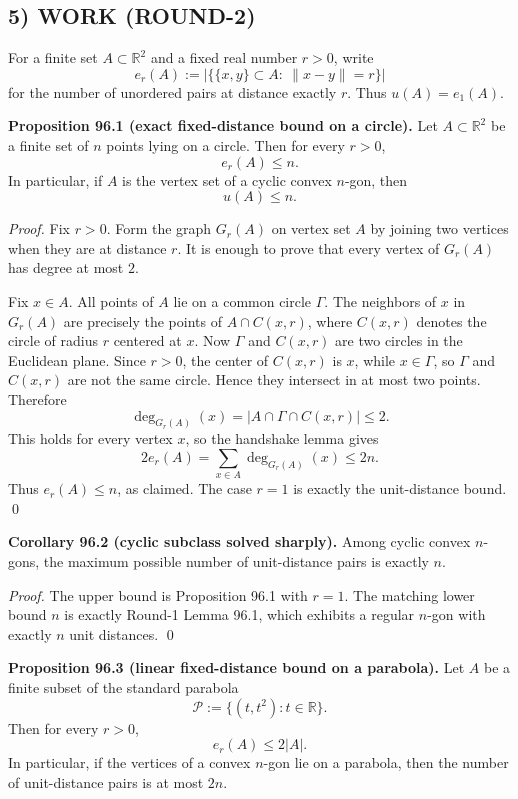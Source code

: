 \subsection*{5) WORK (ROUND-2)}

For a finite set $A\subset \mathbb R^2$ and a fixed real number $r>0$, write
\[
  e_r(A):=\bigl|\{\{x,y\}\subset A:\ \|x-y\|=r\}\bigr|
\]
for the number of unordered pairs at distance exactly $r$.
Thus $u(A)=e_1(A)$.

\medskip
\noindent\textbf{Proposition 96.1 (exact fixed-distance bound on a circle).}
Let $A\subset \mathbb R^2$ be a finite set of $n$ points lying on a circle. Then for every $r>0$,
\[
  e_r(A)\le n.
\]
In particular, if $A$ is the vertex set of a cyclic convex $n$-gon, then
\[
  u(A)\le n.
\]

\emph{Proof.}
Fix $r>0$. Form the graph $G_r(A)$ on vertex set $A$ by joining two vertices when they are at distance $r$.
It is enough to prove that every vertex of $G_r(A)$ has degree at most $2$.

Fix $x\in A$. All points of $A$ lie on a common circle $\Gamma$. The neighbors of $x$ in $G_r(A)$ are precisely the points of $A\cap C(x,r)$, where $C(x,r)$ denotes the circle of radius $r$ centered at $x$.
Now $\Gamma$ and $C(x,r)$ are two circles in the Euclidean plane. Since $r>0$, the center of $C(x,r)$ is $x$, while $x\in \Gamma$, so $\Gamma$ and $C(x,r)$ are not the same circle. Hence they intersect in at most two points. Therefore
\[
  \deg_{G_r(A)}(x)=|A\cap \Gamma\cap C(x,r)|\le 2.
\]
This holds for every vertex $x$, so the handshake lemma gives
\[
  2e_r(A)=\sum_{x\in A}\deg_{G_r(A)}(x)\le 2n.
\]
Thus $e_r(A)\le n$, as claimed. The case $r=1$ is exactly the unit-distance bound. \qed

\medskip
\noindent\textbf{Corollary 96.2 (cyclic subclass solved sharply).}
Among cyclic convex $n$-gons, the maximum possible number of unit-distance pairs is exactly $n$.

\emph{Proof.}
The upper bound is Proposition 96.1 with $r=1$. The matching lower bound $n$ is exactly Round-1 Lemma 96.1, which exhibits a regular $n$-gon with exactly $n$ unit distances. \qed

\medskip
\noindent\textbf{Proposition 96.3 (linear fixed-distance bound on a parabola).}
Let $A$ be a finite subset of the standard parabola
\[
  \mathcal P:=\{(t,t^2): t\in \mathbb R\}.
\]
Then for every $r>0$,
\[
  e_r(A)\le 2|A|.
\]
In particular, if the vertices of a convex $n$-gon lie on a parabola, then the number of unit-distance pairs is at most $2n$.


